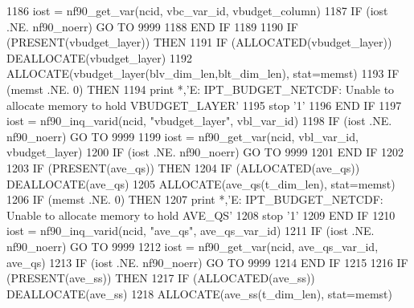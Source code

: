 \begin{DoxyCode}
1186         iost = nf90\_get\_var(ncid, vbc\_var\_id, vbudget\_column)
1187         \textcolor{keywordflow}{IF} (iost .NE. nf90\_noerr) \textcolor{keywordflow}{GO TO} 9999
1188 \textcolor{keywordflow}{    END IF}
1189 
1190     \textcolor{keywordflow}{IF} (\textcolor{keyword}{PRESENT}(vbudget\_layer)) \textcolor{keywordflow}{THEN}
1191         \textcolor{keywordflow}{IF} (\textcolor{keyword}{ALLOCATED}(vbudget\_layer))          \textcolor{keyword}{DEALLOCATE}(vbudget\_layer)
1192         \textcolor{keyword}{ALLOCATE}(vbudget\_layer(blv\_dim\_len,blt\_dim\_len), stat=memst)
1193         \textcolor{keywordflow}{IF} (memst .NE. 0) \textcolor{keywordflow}{THEN}
1194             print *,\textcolor{stringliteral}{'E: IPT\_BUDGET\_NETCDF: Unable to allocate memory to hold VBUDGET\_LAYER'}
1195             stop \textcolor{stringliteral}{'1'}
1196 \textcolor{keywordflow}{        END IF}
1197         iost = nf90\_inq\_varid(ncid, \textcolor{stringliteral}{"vbudget\_layer"}, vbl\_var\_id)
1198         \textcolor{keywordflow}{IF} (iost .NE. nf90\_noerr) \textcolor{keywordflow}{GO TO} 9999
1199         iost = nf90\_get\_var(ncid, vbl\_var\_id, vbudget\_layer)
1200         \textcolor{keywordflow}{IF} (iost .NE. nf90\_noerr) \textcolor{keywordflow}{GO TO} 9999
1201 \textcolor{keywordflow}{    END IF}
1202 
1203     \textcolor{keywordflow}{IF} (\textcolor{keyword}{PRESENT}(ave\_qs)) \textcolor{keywordflow}{THEN}
1204         \textcolor{keywordflow}{IF} (\textcolor{keyword}{ALLOCATED}(ave\_qs))           \textcolor{keyword}{DEALLOCATE}(ave\_qs)
1205         \textcolor{keyword}{ALLOCATE}(ave\_qs(t\_dim\_len), stat=memst)
1206         \textcolor{keywordflow}{IF} (memst .NE. 0) \textcolor{keywordflow}{THEN}
1207             print *,\textcolor{stringliteral}{'E: IPT\_BUDGET\_NETCDF: Unable to allocate memory to hold AVE\_QS'}
1208             stop \textcolor{stringliteral}{'1'}
1209 \textcolor{keywordflow}{        END IF}
1210         iost = nf90\_inq\_varid(ncid, \textcolor{stringliteral}{"ave\_qs"}, ave\_qs\_var\_id)
1211         \textcolor{keywordflow}{IF} (iost .NE. nf90\_noerr) \textcolor{keywordflow}{GO TO} 9999
1212         iost = nf90\_get\_var(ncid, ave\_qs\_var\_id, ave\_qs)
1213         \textcolor{keywordflow}{IF} (iost .NE. nf90\_noerr) \textcolor{keywordflow}{GO TO} 9999
1214 \textcolor{keywordflow}{    END IF}
1215 
1216     \textcolor{keywordflow}{IF} (\textcolor{keyword}{PRESENT}(ave\_ss)) \textcolor{keywordflow}{THEN}
1217         \textcolor{keywordflow}{IF} (\textcolor{keyword}{ALLOCATED}(ave\_ss))           \textcolor{keyword}{DEALLOCATE}(ave\_ss)
1218         \textcolor{keyword}{ALLOCATE}(ave\_ss(t\_dim\_len), stat=memst)

\end{DoxyCode}
